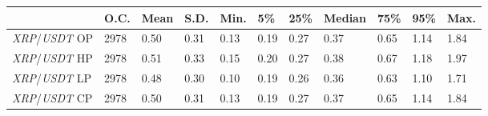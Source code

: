 \begin{tabular}{lllllllllll}
\toprule
 & \textbf{O.C.} & \textbf{Mean} & \textbf{S.D.} & \textbf{Min.} & \textbf{5\%} & \textbf{25\%} & \textbf{Median} & \textbf{75\%} & \textbf{95\%} & \textbf{Max.} \\
\midrule
\emph{XRP}/\emph{USDT} OP & 2978 & 0.50 & 0.31 & 0.13 & 0.19 & 0.27 & 0.37 & 0.65 & 1.14 & 1.84 \\
\emph{XRP}/\emph{USDT} HP & 2978 & 0.51 & 0.33 & 0.15 & 0.20 & 0.27 & 0.38 & 0.67 & 1.18 & 1.97 \\
\emph{XRP}/\emph{USDT} LP & 2978 & 0.48 & 0.30 & 0.10 & 0.19 & 0.26 & 0.36 & 0.63 & 1.10 & 1.71 \\
\emph{XRP}/\emph{USDT} CP & 2978 & 0.50 & 0.31 & 0.13 & 0.19 & 0.27 & 0.37 & 0.65 & 1.14 & 1.84 \\
\bottomrule
\end{tabular}
